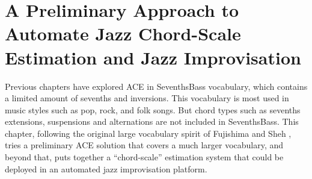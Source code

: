 

\chapter{A Preliminary Approach to Automate Jazz Chord-Scale Estimation and Jazz Improvisation}\label{cp:jazz} %




Previous chapters have explored ACE in SeventhsBass vocabulary, which contains a limited amount of sevenths and inversions. This vocabulary is most used in music styles such as pop, rock, and folk songs. But chord types such as sevenths extensions, suspensions and alternations are not included in SeventhsBass. This chapter, following the original large vocabulary spirit of Fujishima \cite{fujishima1999realtime} and Sheh \cite{sheh2003chord}, tries a preliminary ACE solution that covers a much larger vocabulary, and beyond that, puts together a ``chord-scale'' estimation system that could be deployed in an automated jazz improvisation platform.

